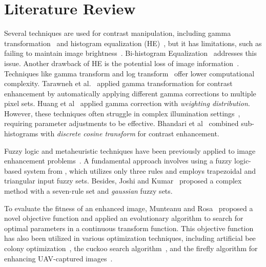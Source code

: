 \section{Literature Review}
\label{section:literature}
Several techniques are used for contrast manipulation, including gamma transformation~\cite{singh2014various,HCC2012} and histogram equalization (HE)~\cite{singh2015histogram,stark2000adaptive}, but it has limitations, such as failing to maintain image brightness~\cite{shanmugavadivu2014particle}. Bi-histogram Equalization~\cite{ooi2009bi} addresses this issue. Another drawback of HE is the potential loss of image information~\cite{zhu2012adaptive}. Techniques like gamma transform and log transform~\cite{singh2014various} offer lower computational complexity. Tarawneh et al.~\cite{tarawneh2020automatic} applied gamma transformation for contrast enhancement by automatically applying different gamma corrections to multiple pixel sets. 
Huang et al~\cite{HCC2012} applied gamma correction with {\em weighting distribution}.
However, these techniques often struggle in complex illumination settings~\cite{oloyede2019new}, requiring parameter adjustments to be effective.
Bhandari et al~\cite{bhandari2019novel} combined sub-histograms with {\em discrete cosine transform} for contrast enhancement.

Fuzzy logic and metaheuristic techniques have been previously applied to image enhancement problems~\cite{korytkowski2020efficient,fuzzy_plus_meta,diaz2017new}. A fundamental approach involves using a fuzzy logic-based system from \cite{gonzalez2008digital}, which utilizes only three rules and employs trapezoidal and triangular input fuzzy sets. Besides, Joshi and Kumar~\cite{s2018image} proposed a complex method with a seven-rule set and {\em gaussian} fuzzy sets.

To evaluate the fitness of an enhanced image, Munteanu and Rosa~\cite{munteanu2004gray} proposed a novel objective function and applied an evolutionary algorithm to search for optimal parameters in a continuous transform function. This objective function has also been utilized in various optimization techniques, including artificial bee colony optimization~\cite{draa2014artificial}, the cuckoo search algorithm~\cite{bhandari2020cuckoo}, and the firefly algorithm for enhancing UAV-captured images~\cite{samanta2018log}.

